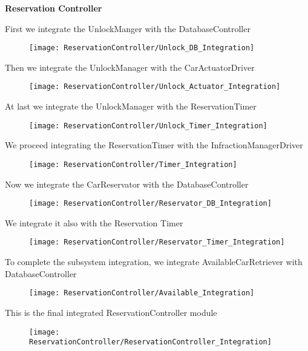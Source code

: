 \textbf{Reservation Controller}

First we integrate the UnlockManger with the DatabaseController
\begin{figure}[H]
\centering
\texttt{[image: ReservationController/Unlock\_DB\_Integration]}
\end{figure}

Then we integrate the UnlockManager with the CarActuatorDriver
\begin{figure}[H]
\centering
\texttt{[image: ReservationController/Unlock\_Actuator\_Integration]}
\end{figure}

At last we integrate the UnlockManager with the ReservationTimer
\begin{figure}[H]
\centering
\texttt{[image: ReservationController/Unlock\_Timer\_Integration]}
\end{figure}

We proceed integrating the ReservationTimer with the InfractionManagerDriver
\begin{figure}[H]
\centering
\texttt{[image: ReservationController/Timer\_Integration]}
\end{figure}

Now we integrate the CarReservator with the DatabaseController
\begin{figure}[H]
\centering
\texttt{[image: ReservationController/Reservator\_DB\_Integration]}
\end{figure}

We integrate it also with the Reservation Timer
\begin{figure}[H]
\centering
\texttt{[image: ReservationController/Reservator\_Timer\_Integration]}
\end{figure}

To complete the subsystem integration, we integrate AvailableCarRetriever with DatabaseController
\begin{figure}[H]
\centering
\texttt{[image: ReservationController/Available\_Integration]}
\end{figure}

This is the final integrated ReservationController module
\begin{figure}[H]
\centering
\texttt{[image: ReservationController/ReservationController\_Integration]}
\end{figure}